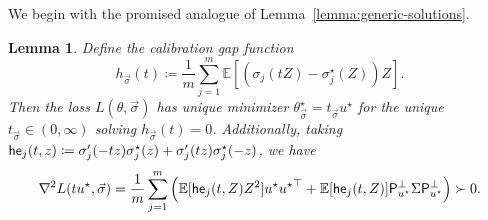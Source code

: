 \documentclass[11pt]{article}
\newcommand{\E}{\mathbb{E}}
\newcommand{\proj}{\mathsf{P}}
\newcommand{\projperp}{\proj_{u\opt}^\perp}
\newcommand{\<}{\langle} %
\renewcommand{\>}{\rangle}
\newcommand{\defeq}{\coloneqq}
\newcommand{\opt}{^\star}
\newtheorem{lemma}[claim]{Lemma}
\begin{document}
We begin with the promised analogue of
Lemma~\ref{lemma:generic-solutions}.
\begin{lemma}
  \label{lemma:super-generic-solutions}
  Define the calibration gap function
  \begin{equation}
    \label{eqn:general-h-m-func}
    h_{\vec{\sigma}}(t)
    \defeq \frac{1}{m} \sum_{j = 1}^m
    \E\left[\left(\sigma_j(tZ) - \sigma_j\opt(Z)\right) Z\right].
  \end{equation}
  Then the loss $L(\theta, \vec{\sigma})$ has unique
  minimizer $\theta\opt_{\vec{\sigma}} = t_{\vec{\sigma}} u\opt$ for the
  unique $t_{\vec{\sigma}} \in (0, \infty)$ solving
  $h_{\vec{\sigma}}(t) = 0$. Additionally,
  taking
  $\hessfunc_j(t, z) \defeq
  \sigma_j'(-tz) \sigma_j\opt(z) + \sigma_j'(tz) \sigma_j\opt(-z)$,
  we have
  \begin{equation*}
    \nabla^2 L(t u\opt, \vec{\sigma})
    = \frac{1}{m} \sum_{j = 1}^m \left(
    \E[\hessfunc_j(t, Z) Z^2] u\opt {u\opt}^\top
    + \E[\hessfunc_j(t, Z)] \projperp \Sigma \projperp \right)
    \succ 0.
  \end{equation*}
\end{lemma}
\end{document}
